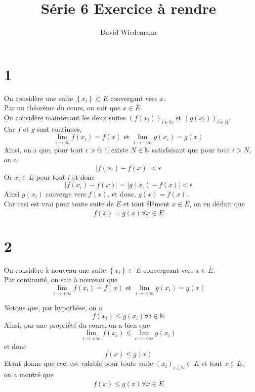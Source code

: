 \documentclass[11pt, a4paper]{article}
\begin{document}
\title{Série 6 Exercice à rendre}
\author{David Wiedemann}
\maketitle
\section*{1}
On considère une suite $ \left\{ x_i \right\} \subset E$ convergant vers $x$.\\
Par un théorème du cours, on sait que $x \in \overline{E}$.\\
On considère maintenant les deux suites $( f( x_i) )_{i \in \mathbb{N}}  $ et $( g( x_{i} ) )_{i \in \mathbb{N}}$.\\
Car $f$ et $g$ sont continues, 
\[ 
	\lim_{i \to \infty } f( x_i) = f( x) \text{ et } \lim_{i \to  + \infty} g( x_i) = g( x) 
\]
Ainsi, on a que, pour tout $\epsilon>0$, il existe $N \in \mathbb{N}$ satisfaisant que pour tout $i>N$, on a
\[ 
	|f( x_i) - f( x)| < \epsilon
\]
Or $x_i \in E$ pour tout $i$ et donc
\[ 
	|f( x_i) - f( x)| =|g( x_i) - f( x)| <\epsilon
\]
Ainsi $g( x_i) $ converge vers $f( x) $, et donc, $g( x) = f( x) $.\\
Car ceci est vrai pour toute suite de $E$ et tout élément $x \in \overline{E}$, on en déduit que 
\[ 
	f( x) =g( x)  \forall x \in \overline{E}
\]

\section*{2}
On considère à nouveau une suite $ \left\{ x_i \right\} \subset E$ convergeant vers $x \in \overline{E}$.\\
Par continuité, on sait à nouveau que 
\[ 
	\lim_{i \to +\infty } f( x_i) = f( x) \text{ et } \lim_{i \to  + \infty} g( x_i) = g( x) 
\]

Notons que, par hypothèse, on a
\[ 
	f( x_i) \leq g( x_i) \forall i \in \mathbb{N}
\]
Ainsi, par une propriété du cours, on a bien que
\[ 
	\lim_{i \to  + \infty} f( x_i) \leq \lim_{i \to  + \infty} g( x_i) 
\]
et donc
\[ 
	f( x) \leq g( x) 
\]
Etant donne que ceci est valable pour toute suite  $ ( x_i)_{i \in \mathbb{N}} \subset E$ et tout $x \in \overline{E}$, on a montré que
\[ 
	f( x) \leq g( x) \forall x \in \overline{E}
\]
\end{document}
